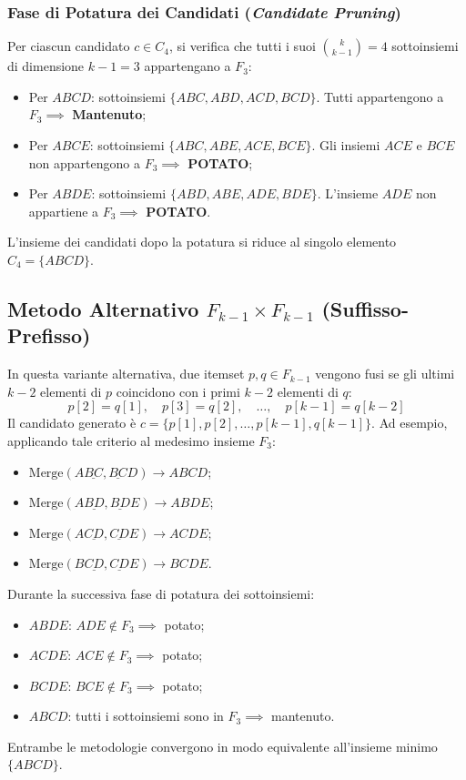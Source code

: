 \subsubsection{Fase di Potatura dei Candidati (\textit{Candidate Pruning})}
Per ciascun candidato $c \in C_4$, si verifica che tutti i suoi $\binom{k}{k-1} = 4$ sottoinsiemi di dimensione $k-1 = 3$ appartengano a $F_3$:
\begin{itemize}[noitemsep]
    \item Per $ABCD$: sottoinsiemi $\{ABC, ABD, ACD, BCD\}$. Tutti appartengono a $F_3 \implies$ \textbf{Mantenuto};
    \item Per $ABCE$: sottoinsiemi $\{ABC, ABE, ACE, BCE\}$. Gli insiemi $ACE$ e $BCE$ non appartengono a $F_3 \implies$ \textbf{POTATO};
    \item Per $ABDE$: sottoinsiemi $\{ABD, ABE, ADE, BDE\}$. L'insieme $ADE$ non appartiene a $F_3 \implies$ \textbf{POTATO}.
\end{itemize}
L'insieme dei candidati dopo la potatura si riduce al singolo elemento $C_4 = \{ABCD\}$.

\FloatBarrier
\subsection{Metodo Alternativo $F_{k-1} \times F_{k-1}$ (Suffisso-Prefisso)}
In questa variante alternativa, due itemset $p, q \in F_{k-1}$ vengono fusi se gli ultimi $k-2$ elementi di $p$ coincidono con i primi $k-2$ elementi di $q$:
\begin{equation}
\label{eq:dm-suffix-prefix-condition}
p[2] = q[1], \quad p[3] = q[2], \quad \dots, \quad p[k-1] = q[k-2]
\end{equation}
Il candidato generato è $c = \{p[1], p[2], \dots, p[k-1], q[k-1]\}$.
Ad esempio, applicando tale criterio al medesimo insieme $F_3$:
\begin{itemize}[noitemsep]
    \item $\mathrm{Merge}(A\underline{BC}, \underline{BC}D) \rightarrow ABCD$;
    \item $\mathrm{Merge}(A\underline{BD}, \underline{BD}E) \rightarrow ABDE$;
    \item $\mathrm{Merge}(A\underline{CD}, \underline{CD}E) \rightarrow ACDE$;
    \item $\mathrm{Merge}(B\underline{CD}, \underline{CD}E) \rightarrow BCDE$.
\end{itemize}
Durante la successiva fase di potatura dei sottoinsiemi:
\begin{itemize}[noitemsep]
    \item $ABDE$: $ADE \notin F_3 \implies$ potato;
    \item $ACDE$: $ACE \notin F_3 \implies$ potato;
    \item $BCDE$: $BCE \notin F_3 \implies$ potato;
    \item $ABCD$: tutti i sottoinsiemi sono in $F_3 \implies$ mantenuto.
\end{itemize}
Entrambe le metodologie convergono in modo equivalente all'insieme minimo $\{ABCD\}$.

